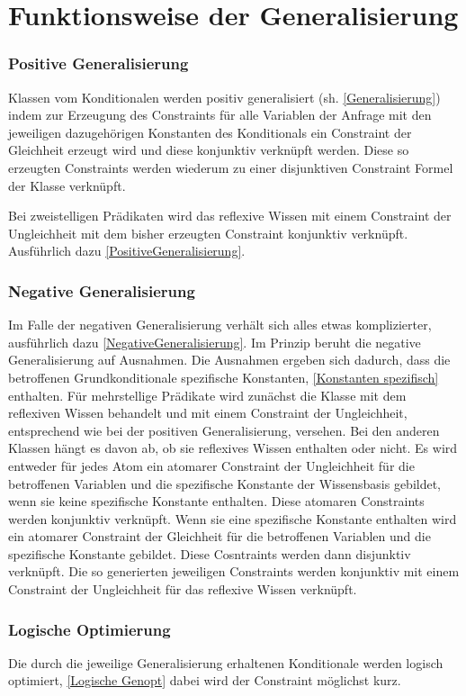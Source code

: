 \documentclass[a4paper, 11pt]{book}
\begin{document}
\label{general}
\section{Funktionsweise der Generalisierung} 
\subsubsection{Positive Generalisierung}  \label{Funktion positiv}
Klassen vom Konditionalen werden positiv generalisiert (sh. \ref{Generalisierung}) indem zur Erzeugung des Constraints für alle Variablen der Anfrage mit den jeweiligen dazugehörigen Konstanten des Konditionals ein Constraint der Gleichheit erzeugt wird und diese konjunktiv verknüpft werden. Diese so erzeugten Constraints werden wiederum zu einer disjunktiven Constraint Formel der Klasse verknüpft.{ Bei zweistelligen Prädikaten wird das reflexive Wissen mit einem Constraint der Ungleichheit mit dem bisher erzeugten Constraint konjunktiv verknüpft. Ausführlich dazu \ref{PositiveGeneralisierung}.
\subsubsection{Negative Generalisierung}  \label{Funktion negativ}
Im Falle der negativen Generalisierung verhält sich alles etwas komplizierter, ausführlich dazu \ref{NegativeGeneralisierung}. 
Im Prinzip beruht die negative Generalisierung auf Ausnahmen. Die Ausnahmen ergeben sich dadurch, dass die betroffenen Grundkonditionale spezifische Konstanten, \ref{Konstanten spezifisch} enthalten. Für mehrstellige Prädikate wird zunächst die Klasse mit dem reflexiven Wissen behandelt und mit einem Constraint der Ungleichheit, entsprechend wie bei der positiven Generalisierung, versehen. Bei den anderen Klassen hängt es davon ab, ob sie reflexives Wissen enthalten oder nicht. Es wird entweder für jedes Atom ein atomarer Constraint der Ungleichheit für die betroffenen Variablen und die spezifische Konstante der Wissensbasis gebildet, wenn sie keine spezifische Konstante enthalten. Diese atomaren Constraints werden konjunktiv verknüpft. Wenn sie eine spezifische Konstante enthalten wird ein atomarer Constraint der Gleichheit für die betroffenen Variablen und die spezifische Konstante gebildet. Diese Cosntraints werden dann disjunktiv verknüpft. Die so generierten jeweiligen Constraints werden konjunktiv mit einem Constraint der Ungleichheit für das reflexive Wissen verknüpft.
\subsubsection{Logische Optimierung}
Die durch die jeweilige Generalisierung erhaltenen Konditionale werden logisch optimiert, \ref{Logische Genopt} dabei wird der Constraint möglichst kurz. 
}
\end{document}
